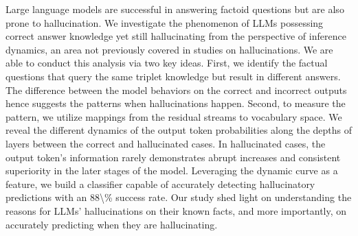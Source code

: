 Large language models are successful in answering factoid questions but are also prone to hallucination. We investigate the phenomenon of LLMs possessing correct answer knowledge yet still hallucinating from the perspective of inference dynamics, an area not previously covered in studies on hallucinations. We are able to conduct this analysis via two key ideas. First, we identify the factual questions that query the same triplet knowledge but result in different answers. The difference between the model behaviors on the correct and incorrect outputs hence suggests the patterns when hallucinations happen. Second, to measure the pattern, we utilize mappings from the residual streams to vocabulary space. We reveal the different dynamics of the output token probabilities along the depths of layers between the correct and hallucinated cases.  In hallucinated cases, the output token's information rarely demonstrates abrupt increases and consistent superiority in the later stages of the model. Leveraging the dynamic curve as a feature, we build a classifier capable of accurately detecting hallucinatory predictions with an 88\textbackslash{}\% success rate.  Our study shed light on understanding the reasons for LLMs' hallucinations on their known facts, and more importantly, on accurately predicting when they are hallucinating.